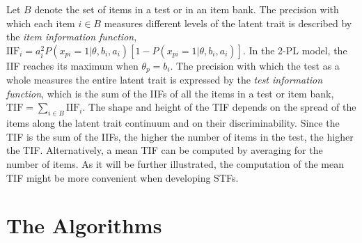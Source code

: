 \documentclass[12pt, a4paper, titilepage]{article}
\begin{document}
Let $B$ denote the set of items in a test or in an item bank. The precision with which each item $i \in B$ measures different levels of the latent trait is described by the \emph{item information function}, $\text{IIF}_i = a_i^2P(x_{pi} = 1|\theta, b_i, a_i)[1- P(x_{pi} = 1|\theta, b_i, a_i)]$. In the 2-PL model, the IIF reaches its maximum when $\theta_p = b_i$. The precision with which the test as a whole measures the entire latent trait is expressed by the \emph{test information function}, which is the sum of the IIFs of all the items in a test or item bank, $\text{TIF} = \sum_{i \in B} \text{IIF}_i$. 
The shape and height of the TIF depends on the spread of the items along the latent
trait continuum and on their discriminability.
 Since the TIF is the sum of the IIFs, the higher the number of items in the test, the higher the TIF. Alternatively, a mean TIF can be computed by averaging for the number of items. As it will be further illustrated, the computation of the mean TIF might be more convenient when developing STFs.


\normalcolor

\section*{The Algorithms}
\end{document}
